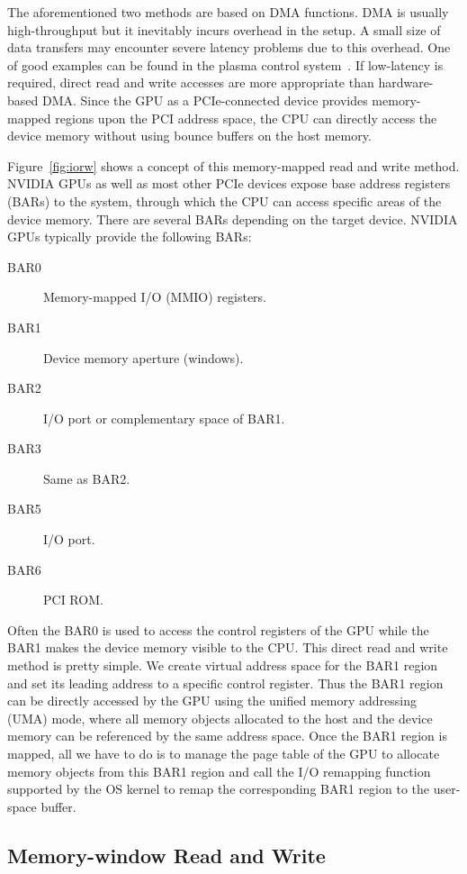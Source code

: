 The aforementioned two methods are based on DMA functions.
DMA is usually high-throughput but it inevitably incurs overhead in the
setup.
A small size of data transfers may encounter severe latency problems due
to this overhead.
One of good examples can be found in the plasma control
system~\cite{Kato_ICCPS13}.
If low-latency is required, direct read and write accesses are more
appropriate than hardware-based DMA.
Since the GPU as a PCIe-connected device provides memory-mapped regions
upon the PCI address space, the CPU can directly access the device
memory without using bounce buffers on the host memory.

Figure~\ref{fig:iorw} shows a concept of this memory-mapped read and
write method.
NVIDIA GPUs as well as most other PCIe devices expose base address
registers (BARs) to the system, through which the CPU can access
specific areas of the device memory.
There are several BARs depending on the target device.
NVIDIA GPUs typically provide the following BARs:
\begin{description}
 \item[BAR0] Memory-mapped I/O (MMIO) registers.
 \item[BAR1] Device memory aperture (windows).
 \item[BAR2] I/O port or complementary space of BAR1.
 \item[BAR3] Same as BAR2.
 \item[BAR5] I/O port.
 \item[BAR6] PCI ROM.
\end{description}
Often the BAR0 is used to access the control registers of the GPU while
the BAR1 makes the device memory visible to the CPU.
This direct read and write method is pretty simple.
We create virtual address space for the BAR1 region and set its leading
address to a specific control register.
Thus the BAR1 region can be directly accessed by the GPU using the
unified memory addressing (UMA) mode, where all memory objects allocated
to the host and the device memory can be referenced by the same address
space.
Once the BAR1 region is mapped, all we have to do is to manage the page
table of the GPU to allocate memory objects from this BAR1 region and
call the I/O remapping function supported by the OS kernel to remap the
corresponding BAR1 region to the user-space buffer.

\subsection{Memory-window Read and Write}
\label{sec:memwnd}

